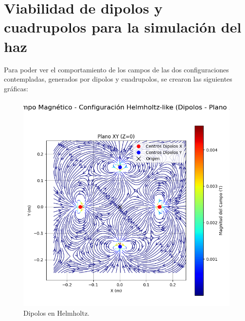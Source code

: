 \section{Viabilidad de dipolos y cuadrupolos para la simulación del haz}

Para poder ver el comportamiento de los campos de las dos configuraciones
contempladas, generados por dipolos y cuadrupolos, se crearon las siguientes
gráficas:

\begin{figure}[H] %
  \centering
  \begin{minipage}[b]{0.48\textwidth} %
    \includegraphics[width=\linewidth, trim={0cm 2cm 0cm 1cm}, clip]{Sections/Figures/helmholtz_dipoles_xy_field.png} %
    \caption{Dipolos en Helmholtz.}
    \label{fig:helmholtz_dipoles_xy_field}
  \end{minipage}
  \hfill
  \begin{minipage}[b]{0.48\textwidth} %

\end{minipage}
\end{figure}
